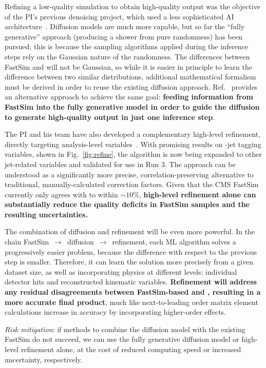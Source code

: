 Refining a low-quality simulation to obtain high-quality output was the objective of the PI's previous denoising project, which used a less sophisticated AI architecture~\cite{Banerjee:2022gkg}.
Diffusion models are much more capable, but so far the ``fully generative'' approach (producing a shower from pure randomness) has been pursued;
this is because the sampling algorithms applied during the inference steps rely on the Gaussian nature of the randomness.
The differences between FastSim and \GEANTfour will not be Gaussian, so while it is easier in principle to learn the difference between two similar distributions,
additional mathematical formalism must be derived in order to reuse the existing diffusion approach.
Ref.~\cite{Mei:2023} provides an alternative approach to achieve the same goal:
\textbf{feeding information from FastSim into the fully generative model in order to guide the diffusion to generate high-quality output in just one inference step}.

The PI and his team have also developed a complementary high-level refinement, directly targeting analysis-level variables~\cite{Bein:2023ylt}.
With promising results on \cPqb-jet tagging variables, shown in Fig.~\ref{fig:refine},
the algorithm is now being expanded to other jet-related variables and validated for use in Run 3.
The approach can be understood as a significantly more precise, correlation-preserving alternative to traditional, manually-calculated correction factors.
Given that the CMS FastSim currently only agrees with \GEANTfour to within ${\sim}10\%$,
\textbf{high-level refinement alone can substantially reduce the quality deficits in FastSim samples and the resulting uncertainties.}

The combination of diffusion and refinement will be even more powerful.
In the chain FastSim~$\to$~diffusion~$\to$~refinement, each ML algorithm solves a progressively easier problem,
because the difference with respect to the previous step is smaller.
Therefore, it can learn the solution more precisely from a given dataset size,
as well as incorporating physics at different levels: individual detector hits and reconstructed kinematic variables.
\textbf{Refinement will address any residual disagreements between FastSim-based \diffu and \GEANTfour,
resulting in a more accurate final product}, much like next-to-leading order matrix element calculations increase in accuracy by incorporating higher-order effects.

\textit{Risk mitigation}: if methods to combine the diffusion model with the existing FastSim do not succeed,
we can use the fully generative diffusion model or high-level refinement alone, at the cost of reduced computing speed or increased uncertainty, respectively.

